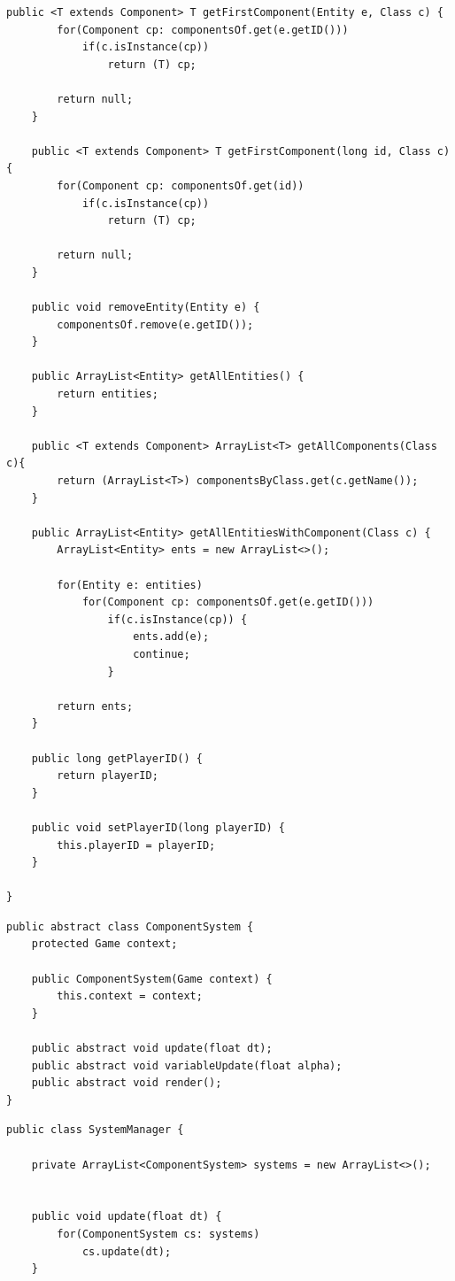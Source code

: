 \documentclass[12pt, 
openright, 
oneside, 
a4paper,    
brazil]{facom-ufu-abntex2}
\begin{document}
\begin{apendicesenv}
\begin{lstlisting}[caption=Classe EntityManager responsável por gerenciar as entidades]
	public <T extends Component> T getFirstComponent(Entity e, Class c) {
		for(Component cp: componentsOf.get(e.getID()))
			if(c.isInstance(cp))
				return (T) cp;
		
		return null;
	}
	
	public <T extends Component> T getFirstComponent(long id, Class c) {
		for(Component cp: componentsOf.get(id))
			if(c.isInstance(cp))
				return (T) cp;
		
		return null;
	}
	
	public void removeEntity(Entity e) {
		componentsOf.remove(e.getID());
	}
	
	public ArrayList<Entity> getAllEntities() {
		return entities;
	}
	
	public <T extends Component> ArrayList<T> getAllComponents(Class c){
		return (ArrayList<T>) componentsByClass.get(c.getName());
	}
	
	public ArrayList<Entity> getAllEntitiesWithComponent(Class c) {
		ArrayList<Entity> ents = new ArrayList<>();
		
		for(Entity e: entities)
			for(Component cp: componentsOf.get(e.getID()))
				if(c.isInstance(cp)) {
					ents.add(e);
					continue;
				}
					
		return ents;
	}

	public long getPlayerID() {
		return playerID;
	}

	public void setPlayerID(long playerID) {
		this.playerID = playerID;
	}

}

\end{lstlisting}

\begin{lstlisting}[caption=Classe ComponentSystem responsável por definir a abstração dos sistemas de componente]
public abstract class ComponentSystem {
	protected Game context;
	
	public ComponentSystem(Game context) {
		this.context = context;
	}
	
	public abstract void update(float dt);
	public abstract void variableUpdate(float alpha);
	public abstract void render();
}
\end{lstlisting}

\begin{lstlisting}[caption=Classe SystemManager responsável por gerenciar os sistemas de componentes]
public class SystemManager {
	
	private ArrayList<ComponentSystem> systems = new ArrayList<>();

	
	public void update(float dt) {
		for(ComponentSystem cs: systems)
			cs.update(dt);
	}
	

\end{lstlisting}
\end{apendicesenv}
\end{document}
